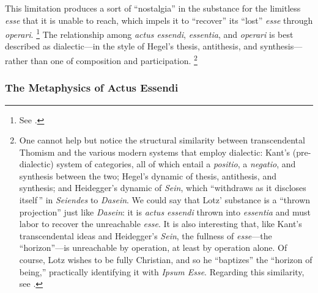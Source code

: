 %
This limitation produces a sort of ``nostalgia'' in the substance for the limitless \emph{esse} that it is unable to reach, which impels it to ``recover'' its ``lost'' \emph{esse} through \emph{operari}.%
%
\footnote{See \cite[227-228]{contat:confronto}.}
%
The relationship among \emph{actus essendi}, \emph{essentia}, and \emph{operari} is best described as dialectic---in the style of Hegel's thesis, antithesis, and synthesis---rather than one of composition and participation.%
%
\footnote{One cannot help but notice the structural similarity between transcendental Thomism and the various modern systems that employ dialectic: Kant's (pre-dialectic) system of categories, all of which entail a \emph{positio}, a \emph{negatio}, and synthesis between the two; Hegel's dynamic of thesis, antithesis, and synthesis; and Heidegger's dynamic of \emph{Sein}, which ``withdraws as it discloses itself\,'' in \emph{Seiendes} to \emph{Dasein}. We could say that Lotz' substance is a ``thrown projection'' just like \emph{Dasein}: it is \emph{actus essendi} thrown into \emph{essentia} and must labor to recover the unreachable \emph{esse}. It is also interesting that, like Kant's transcendental ideas and Heidegger's \emph{Sein}, the fullness of \emph{esse}---the ``horizon''---is unreachable by operation, at least by operation alone. Of course, Lotz wishes to be fully Christian, and so he ``baptizes'' the ``horizon of being,'' practically identifying it with \emph{Ipsum Esse}.
Regarding this similarity, see \cite{contat:confronto}.}

\subsubsection{The Metaphysics of Actus Essendi}


